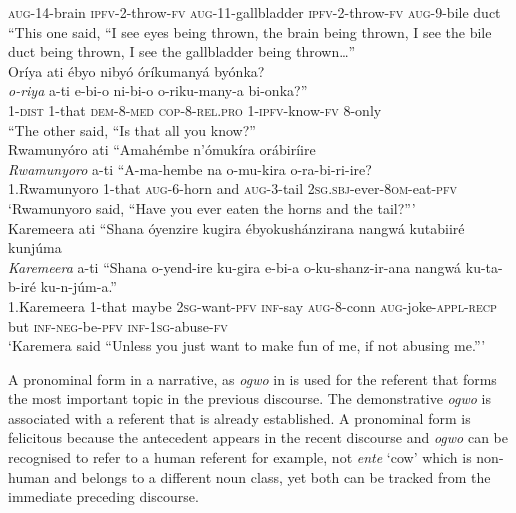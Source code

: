 \documentclass[output=paper 		  ]{langscibook}
\begin{document}
  \textsc{aug}{}-14-brain  \textsc{ipfv}{}-2-throw-\textsc{fv}  \textsc{aug}{}-11-gallbladder  \textsc{ipfv}{}-2-throw-\textsc{fv}  {\textsc{aug}{}-9-bile duct}\\
\glt  “This one said, “I see eyes being thrown, the brain being thrown, I see the bile duct being thrown, I see the gallbladder being thrown…”\\
  Oríya ati ébyo nibyó óríkumanyá byónka?\\
\gll  \emph{o-riya}  a-ti  e-bi-o  ni-bi-o  o-riku-many-a  bi-onka?”\\
  1-\textsc{dist}  1-that  \textsc{dem}{}-8-\textsc{med}  \textsc{cop}{}-8-\textsc{rel.pro}  1-\textsc{ipfv}{}-know-\textsc{fv}  8-only\\
\glt  “The other said, “Is that all you know?”\\
  Rwamunyóro ati “Amahémbe n’ómukíra orábiríire\\
\gll  \emph{Rwamunyoro}  a-ti  “A-ma-hembe  na  o-mu-kira  o-ra-bi-ri-ire?\\
  1.Rwamunyoro  1-that  \textsc{aug}{}-6-horn  and  \textsc{aug}{-3}-tail  2\textsc{sg.sbj}{}-ever-\textsc{8om-}eat-\textsc{pfv}\\
 \glt ‘Rwamunyoro said, “Have you ever eaten the horns and the tail?”’\\
  Karemeera ati “Shana óyenzire kugira ébyokushánzirana nangwá kutabiiré kunjúma\\
\gll  \emph{Karemeera}  a-ti  “Shana  o-yend-ire  ku-gira  e-bi-a  o-ku-shanz-ir-ana nangwá  ku-ta-b-iré  ku-n-júm-a.”\\
  1.Karemeera  1-that  maybe  2\textsc{sg}{}-want-\textsc{pfv}  \textsc{inf}{}-say  \textsc{aug}{}-8-conn  \textsc{aug-}joke-\textsc{appl-recp}
  but  \textsc{inf-neg}{}-be-\textsc{pfv}  \textsc{inf-1sg}{}-abuse-\textsc{fv}\\
\glt  ‘Karemera said “Unless you just want to make fun of me, if not abusing me.”’
\z

A pronominal form in a narrative, as \textit{ogwo} in  is used for the referent that forms the most important topic in the previous discourse. The demonstrative \textit{ogwo} is associated with a referent that is already established. A pronominal form is felicitous because the antecedent appears in the recent discourse and \textit{ogwo} can be recognised to refer to a human referent for example, not \textit{ente} ‘cow’ which is non-human and belongs to a different noun class, yet both can be tracked from the immediate preceding discourse.
\end{document}
